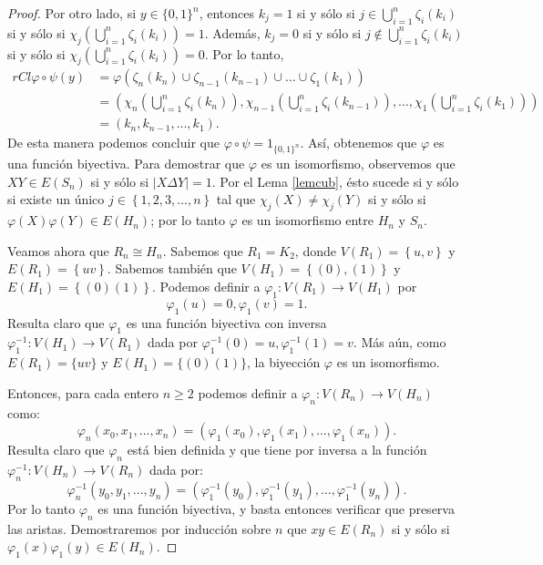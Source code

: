 \begin{proof}
    Por otro lado, si $y \in \{ 0, 1 \}^n$,  entonces $k_j=1$ si y s\'olo si $j \in \bigcup_{i=1}^n \zeta_i(k_i)$ si
    y s\'olo si          $\chi_j(\bigcup_{i=1}^n \zeta_i(k_i))=1$. Adem\'as, $k_j=0$ si y s\'olo si $j \notin
    \bigcup_{i=1}^n \zeta_i (k_i)$ si y s\'olo si $\chi_j(\bigcup_{i=1}^n \zeta_i(k_i))=0$. Por lo tanto,
    \begin{align*}{rCl}
        \varphi \circ \psi(y) &= \varphi(\zeta_n (k_n) \cup \zeta_{n-1}(k_{n-1}) \cup \dots \cup \zeta_1(k_1)) \\
        &= (\chi_n (\bigcup_{i=1}^n \zeta_i(k_n)), \chi_{n-1}(\bigcup_{i=1}^n \zeta_i(k_{n-1})), \dots,
        \chi_1(\bigcup_{i=1}^n   \zeta_i(k_1))) \\
        &= (k_n, k_{n-1}, \dots, k_1).
    \end{align*}
    De esta manera podemos concluir que $\varphi \circ \psi = 1_{\{ 0, 1 \}^n}$. As\'i, obtenemos que $\varphi$ es
    una funci\'on biyectiva. Para demostrar que $\varphi$ es un isomorfismo, observemos que $XY \in E(S_n)$ si y
    s\'olo si $|X \Delta Y|=1$. Por el Lema \ref{lemcub}, \'esto sucede si y s\'olo si existe un \'unico $j \in
    \left\{1,2,3, \dots, n\right\}$ tal que $\chi_j(X) \ne \chi_j(Y)$ si y s\'olo si $\varphi(X) \varphi(Y) \in E
    (H_n)$; por lo tanto $\varphi$ es un isomorfismo entre $H_n$ y $S_n$.

    Veamos ahora que $R_n \cong H_n$. Sabemos que $R_1=K_2$, donde $V(R_1)=\left\{u,v\right\}$ y $E(R_1)
    =\left\{uv\right\}$. Sabemos tambi\' en que $V(H_1)=\left\{(0),(1)\right\}$ y $E(H_1)=\left\{(0)(1)\right\}$.
    Podemos definir a $\varphi_1:V(R_1) \to V(H_1)$ por  $$\varphi_1(u)=0, \varphi_1(v)=1.$$   Resulta claro que
    $\varphi_1$ es una funci\' on biyectiva con inversa $\varphi_1^{-1}:V(H_1) \to V(R_1)$ dada por $\varphi_1^{-1}
    (0)=u, \varphi_1^{-1}(1)=v$. M\' as a\' un, como $E(R_1) = \{ uv \}$ y $E(H_1) = \{ (0)(1) \}$, la biyecci\'on
    $\varphi$ es un isomorfismo.

    Entonces, para cada entero $n \ge 2$ podemos definir a $\varphi_n:V(R_n) \to V(H_n)$ como:   $$\varphi_n(x_0,x_1,
    ..., x_n)=(\varphi_1(x_0),\varphi_1(x_1), ..., \varphi_1(x_n)).$$ Resulta claro que $\varphi_n$ est\'a bien
    definida y que tiene por inversa a la funci\'on $\varphi_n^{-1}:V(H_n) \to V(R_n)$ dada por:
    $$\varphi_n^{-1}(y_0,y_1, ..., y_n)=(\varphi_1^{-1}(y_0),\varphi_1^{-1}(y_1), \dots , \varphi_1^{-1}(y_n)).$$
    Por lo tanto $\varphi_n$ es una funci\'on biyectiva, y basta entonces verificar que preserva las aristas.
    Demostraremos por inducci\'on sobre $n$ que $xy \in E(R_n)$ si y s\'olo si $\varphi_1(x)\varphi_1(y) \in E(H_n)$.


\end{proof}
